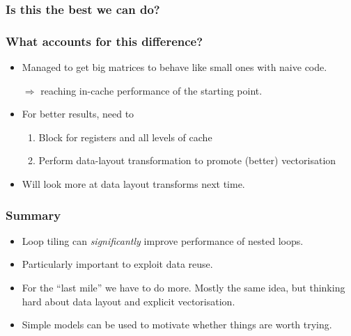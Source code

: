 \documentclass[presentation,aspectratio=43,10pt]{beamer}
\begin{document}
\begin{frame}
  \frametitle{Is this the best we can do?}
  \begin{center}
  \end{center}
\end{frame}

\begin{frame}
  \frametitle{What accounts for this difference?}
  \begin{itemize}
  \item Managed to get big matrices to behave like small ones with
    naive code.
  \item[$\Rightarrow$] reaching in-cache performance of the starting
    point.
  \item For better results, need to
    \begin{enumerate}
    \item Block for registers and all levels of cache
    \item Perform data-layout transformation to promote (better) vectorisation
    \end{enumerate}
  \item Will look more at data layout transforms next time.
  \end{itemize}
\end{frame}

\begin{frame}
  \frametitle{Summary}
  \begin{itemize}
  \item Loop tiling can \emph{significantly} improve performance of
    nested loops.
  \item Particularly important to exploit data reuse.
  \item For the ``last mile'' we have to do more. Mostly the same
    idea, but thinking hard about data layout and explicit
    vectorisation.
  \item Simple models can be used to motivate whether things are worth trying.
  \end{itemize}
\end{frame}
\end{document}
